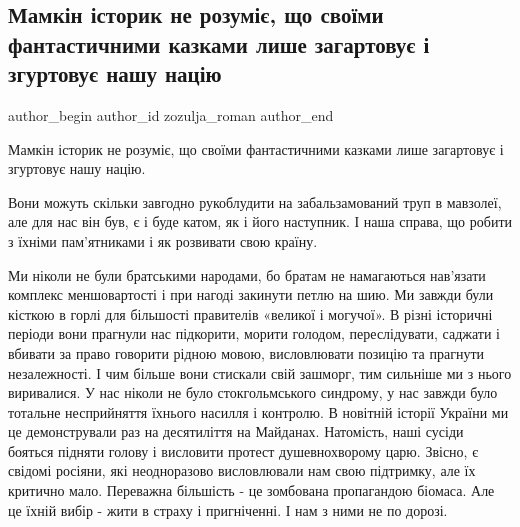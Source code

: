  
 
 
 
 
 
\subsection{Мамкін історик не розуміє, що своїми фантастичними казками лише загартовує і згуртовує нашу націю}
\label{sec:22_02_2022.fb.zozulja_roman.1.mamkin_istorik}
 
\ifcmt
 author_begin
   author_id zozulja_roman
 author_end
\fi

Мамкін історик не розуміє, що своїми фантастичними казками лише загартовує і
згуртовує нашу націю. 

Вони можуть скільки завгодно рукоблудити на забальзамований труп в мавзолеї,
але для нас він був, є і буде катом, як і його наступник. І наша справа, що
робити з їхніми пам’ятниками і як розвивати свою країну.

Ми ніколи не були братськими народами, бо братам не намагаються нав’язати
комплекс меншовартості і при нагоді закинути петлю на шию. Ми завжди були
кісткою в горлі для більшості правителів «великої і могучої». В різні історичні
періоди вони прагнули нас підкорити, морити голодом, переслідувати, саджати і
вбивати за право говорити рідною мовою, висловлювати позицію та прагнути
незалежності. І чим більше вони стискали свій зашморг, тим сильніше ми з нього
виривалися. У нас ніколи не було стокгольмського синдрому, у нас завжди було
тотальне несприйняття їхнього насилля і контролю. В новітній історії України ми
це демонстрували раз на десятиліття на Майданах. Натомість, наші сусіди бояться
підняти голову і висловити протест душевнохворому царю. Звісно, є свідомі
росіяни, які неодноразово висловлювали нам свою підтримку, але їх критично
мало. Переважна більшість - це зомбована  пропагандою біомаса. Але це їхній
вибір - жити в страху і пригніченні. І нам з ними не по дорозі. 

